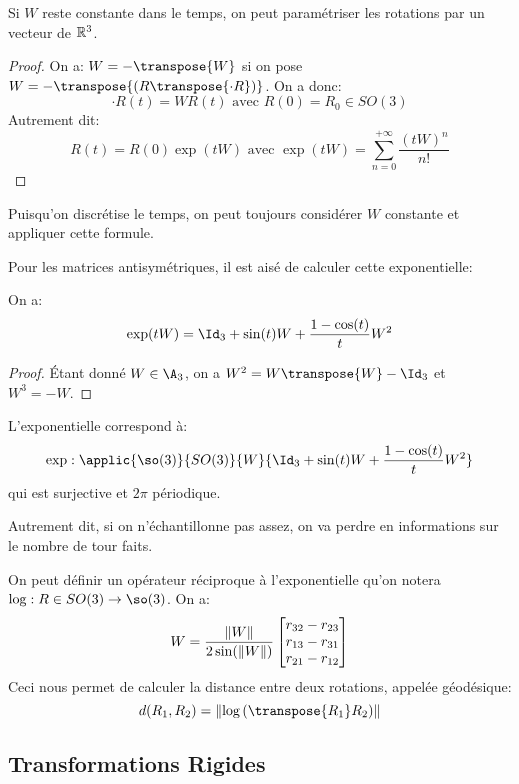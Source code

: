 \documentclass[math]{cours}
\begin{document}
\begin{proposition}
	Si $W$ reste constante dans le temps, on peut paramétriser les rotations par un vecteur de $\mathbb{R}^{3}$.
	\label{prop:exponentialmap}
\end{proposition}
\begin{proof}
	On a: $W = -\transpose{W}$ si on pose $W = -\transpose{\left(R\transpose{\cdot{R}}\right)}$.
	On a donc:
	\begin{equation*}
		\cdot{R}(t) = WR(t) \text{ avec } R(0) = R_{0} \in SO(3)
	\end{equation*}
	Autrement dit:
	\begin{equation*}
		R(t) = R(0) \exp\left(tW\right) \text{ avec } \exp(tW) = \sum_{n = 0}^{+\infty} \frac{\left(tW\right)^{n}}{n!}
	\end{equation*}
\end{proof}
Puisqu'on discrétise le temps, on peut toujours considérer $W$ constante et appliquer cette formule.

Pour les matrices antisymétriques, il est aisé de calculer cette exponentielle:
\begin{proposition}
	On a:
	\begin{equation*}
		\exp(tW) = \Id_{3} + \sin(t)W + \frac{1 - \cos(t)}{t}W^{2}
	\end{equation*}
	\label{prop:antisymmetricexponential}
\end{proposition}
\begin{proof}
	Étant donné $W \in \A_{3}$, on a $W^{2} = W\transpose{W} - \Id_{3}$ et $W^{3} = -W$.
\end{proof}

\begin{proposition}
	L'exponentielle correspond à:
	\begin{equation*}
		\exp: \applic{\so(3)}{SO(3)}{W}{\Id_{3} + \sin(t)W + \frac{1 - \cos(t)}{t}W^{2}}
	\end{equation*}
	qui est surjective et $2\pi$ périodique.
	\label{prop:surjectiveexponential}
\end{proposition}
Autrement dit, si on n'échantillonne pas assez, on va perdre en informations sur le nombre de tour faits.

\begin{thm}
	On peut définir un opérateur réciproque à l'exponentielle qu'on notera $\log: R \in SO(3) \to \so(3)$.
	On a:
	\begin{equation*}
		W = \frac{\left\lVert W\right\rVert}{2\sin(\left\lVert W\right\rVert)}\begin{bmatrix}
			r_{32} - r_{23}\\
			r_{13} - r_{31}\\
			r_{21} - r_{12}
		\end{bmatrix}
	\end{equation*}
	Ceci nous permet de calculer la distance entre deux rotations, appelée géodésique:
	\begin{equation*}
		d(R_{1}, R_{2}) = \norm{\log\left(\transpose{R_{1}}R_{2}\right)}
	\end{equation*}
	\label{prop:definitionlogarithm}
\end{thm}

\subsection{Transformations Rigides}
\end{document}
